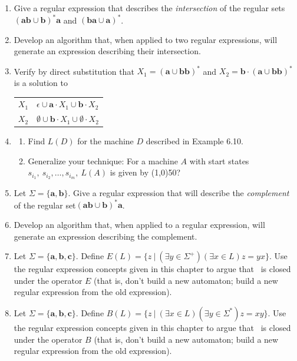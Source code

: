 \begin{enumerate}[{6.}1.]
\item Give a regular expression that describes the \emph{intersection} of
the regular sets $(\pmb{ab}\cup\pmb{b})^*\pmb{a}$ and $(\pmb{ba}\cup\pmb{a})^*$.

\item Develop an algorithm that, when applied to two regular expressions, will
generate an expression describing their intersection.

\item Verify by direct substitution that $X_1=(\pmb{a}\cup\pmb{bb})^*$ and $X_2 =
\pmb{b}\cdot(\pmb{a}\cup\pmb{bb})^*$ is a solution to
\begin{center}\begin{tabular}{r@{ = }l}
$X_1$ & $\epsilon\cup\pmb{a}\cdot X_1\cup\pmb{b}\cdot X_2$ \\
$X_2$ & $\emptyset\cup\pmb{b}\cdot X_1 \cup\emptyset\cdot X_2$
\end{tabular}\end{center}

\item \begin{enumerate}
\item Find $L(D)$ for the machine $D$ described in Example 6.10.
\item Generalize your technique: For a machine $A$ with start states $s_{i_1},\ s_{i_2},
\ldots, s_{i_m},\ L(A)$ is given by \line(1,0){50}?
\end{enumerate}

\item Let $\Sigma=\{\pmb{a},\pmb{b}\}$. Give a regular expression that will
describe the \emph{complement }of the regular set\linebreak$(\pmb{ab}\cup\pmb{b})^*\pmb{a}$.

\item Develop an algorithm that, when applied to a regular expression, will
generate an expression describing the complement.

\item Let $\Sigma=\{\pmb{a},\pmb{b},\pmb{c}\}$. Define $E(L)=\{z\ |\ (\exists y
\in \Sigma^+)(\exists x \in L)z = yx\}$. Use the regular expression concepts
given in this chapter to argue that \RSIG\ is closed under the operator $E$
(that is, don't build a new automaton; build a new regular expression from the
old expression).

\item Let $\Sigma=\{\pmb{a},\pmb{b},\pmb{c}\}$. Define $B(L)=\{z\ |\ (\exists x
\in L)(\exists y \in \Sigma^*)z = xy\}$. Use the regular expression concepts
given in this chapter to argue that \RSIG\ is closed under the operator $B$
(that is, don't build a new automaton; build a new regular expression from the
old expression).


\end{enumerate}
